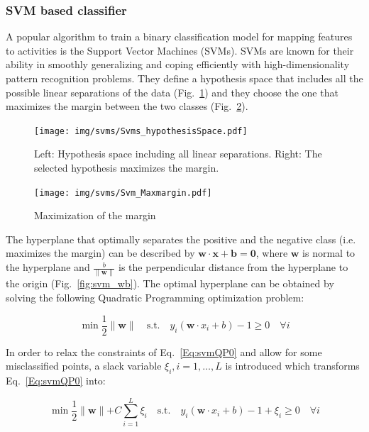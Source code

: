 
\subsubsection*{SVM based classifier}
\label{sec:SVM}

A popular algorithm to train a binary classification model for mapping
features to activities is the Support Vector Machines (SVMs). SVMs are
known for their ability in smoothly generalizing and coping
efficiently with high-dimensionality pattern recognition
problems. They define a hypothesis space that includes all the
possible linear separations of the data
(Fig.~\ref{fig:svm_hypothesisSpace}) and they choose the one that
maximizes the margin between the two classes
(Fig.~\ref{fig:svm_margin}).

\begin{figure}[h]
\centering
  \texttt{[image: img/svms/Svms\_hypothesisSpace.pdf]}
  \caption{Left: Hypothesis space including all linear separations. Right: The selected hypothesis maximizes the margin.}
  \label{fig:svm_hypothesisSpace}
\end{figure}


\begin{figure}[h]
\centering
  \texttt{[image: img/svms/Svm\_Maxmargin.pdf]}
  \caption{Maximization of the margin}
  \label{fig:svm_margin}
\end{figure}

\noindent The hyperplane that optimally separates the positive and the
negative class (i.e. maximizes the margin) can be described by
$\mathbf{w\cdot x + b = 0}$, where $\mathbf{w}$ is normal to the
hyperplane and $\frac{b}{\parallel\mathbf{w}\parallel}$ is the
perpendicular distance from the hyperplane to the origin
(Fig.~\ref{fig:svm_wb}). The optimal hyperplane can be obtained by
solving the following Quadratic Programming optimization problem:

\begin{equation}\label{Eq:svmQP0}
  \min \frac{1}{2}\parallel\mathbf{w}\parallel \quad \text{s.t.} \quad y_i(\mathbf{w}\cdot x_i + b) -1 \ge 0 \quad \forall i
\end{equation}

In order to relax the constraints of Eq.~\ref{Eq:svmQP0} and allow for
some misclassified points, a slack variable $\xi_i, i=1,\ldots,L$ is
introduced which transforms Eq.~\ref{Eq:svmQP0} into:

\begin{equation}\label{Eq:svmQPxi}
  \min \frac{1}{2}\parallel\mathbf{w}\parallel + C\sum_{i=1}^{L}\xi_i \quad \text{s.t.} \quad y_i(\mathbf{w}\cdot x_i + b) -1 +\xi_i \ge 0 \quad \forall i
\end{equation}

